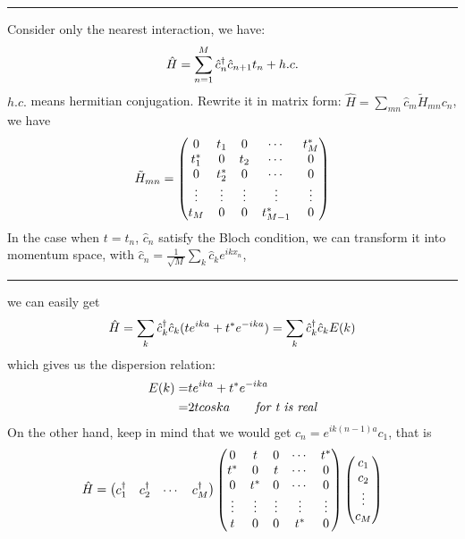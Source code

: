 \documentclass[letterpaper,10pt,english]{sphinxmanual}
\begin{document}
\bigskip\hrule{}\bigskip


Consider only the nearest interaction, we have:
\begin{gather}
\begin{split}\hat{H}=\sum_{n=1}^M \hat{c}_n^\dagger \hat{c}_{n+1}t_n+h.c.\end{split}\notag
\end{gather}
\(h.c.\) means hermitian conjugation. Rewrite it in matrix form:
\(\hat{H}=\sum\limits_{mn}\hat{c}_m \tilde{H}_{mn}c_n\), we have
\begin{gather}
\begin{split}\tilde{H}_{mn}=\begin{pmatrix} 0 & t_1 &0 & \cdots&t_M^*\\
t_1^* &0&t_2&\cdots&0\\
0&t_2^*&0&\cdots&0\\
\vdots&\vdots&\vdots&\vdots&\vdots\\
t_M&0&0&t_{M-1}^*&0
\end{pmatrix}\end{split}\notag
\end{gather}
In the case when \(t=t_n\), \(\hat{c}_n\) satisfy the Bloch
condition, we can transform it into momentum space, with
\(\hat{c}_n=\frac{1}{\sqrt{M}}\sum\limits_k \hat{c}_k e^{ikx_n}\),


\bigskip\hrule{}\bigskip


we can easily get
\begin{gather}
\begin{split}\hat{H}=\sum\limits_k \hat{c}_k^\dagger \hat{c}_k(te^{ika}+t^*e^{-ika})=\sum\limits_k \hat{c}_k^\dagger \hat{c}_k E(k)\end{split}\notag
\end{gather}
which gives us the dispersion relation:
\begin{gather}
\begin{split}E(k)=&te^{ika}+t^*e^{-ika}\\
=&2tcoska \qquad \textit{for t is real}\end{split}\notag
\end{gather}
On the other hand, keep in mind that we would get
\(c_n=e^{ik(n-1)a}c_1\), that is
\begin{gather}
\begin{split}\hat{H}=\begin{pmatrix}c_1^\dagger&c_2^\dagger&\cdots&c_M^\dagger \end{pmatrix}
\begin{pmatrix} 0 & t &0 & \cdots&t^*\\
t^* &0&t&\cdots&0\\
0&t^*&0&\cdots&0\\
\vdots&\vdots&\vdots&\vdots&\vdots\\
t&0&0&t^*&0
\end{pmatrix}
\begin{pmatrix}c_1\\c_2\\\vdots\\c_M\end{pmatrix}\end{split}\notag
\end{gather}
\end{document}
